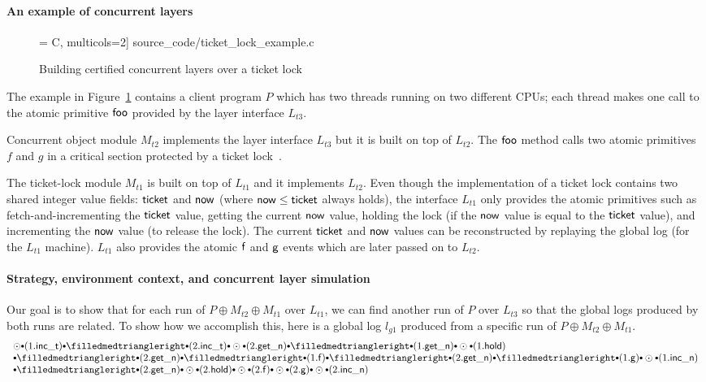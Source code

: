 \paragraph{An example of concurrent layers}
\begin{figure}[t]
\label{fig:exp:ticket_lock_example}
 = C, multicols=2] {source_code/ticket_lock_example.c}
\caption{Building certified concurrent layers over a ticket lock}
\hrulefill
\end{figure}
The example in Figure~\ref{fig:exp:ticket_lock_example} contains a
client program $P$ which has two threads running on two different
CPUs; each thread makes one call to the atomic primitive $\mathsf{foo}$
provided by the layer interface $L_{t3}$.

Concurrent object module $M_{t2}$ implements the layer interface $L_{t3}$
but it is built on top of $L_{t2}$.  The $\mathsf{foo}$ method calls two
atomic primitives $f$ and $g$ in a critical section protected by a
ticket lock~\cite{mcs91}.

The ticket-lock module $M_{t1}$ is built on top of $L_{t1}$ and it
implements $L_{t2}$. Even though the implementation of a ticket lock
contains two shared integer value fields: $\mathsf{ticket}$ and
$\mathsf{now}$ (where $\mathsf{now} \leq \mathsf{ticket}$ always holds), the
interface $L_{t1}$ only provides the atomic primitives such as
fetch-and-incrementing the $\mathsf{ticket}$ value, getting the current
$\mathsf{now}$ value, holding the lock (if the $\mathsf{now}$ value is
equal to the $\mathsf{ticket}$ value), and incrementing the $\mathsf{now}$
value (to release the lock). The current $\mathsf{ticket}$ and
$\mathsf{now}$ values can be reconstructed by replaying the global log
(for the $L_{t1}$ machine).  $L_{t1}$ also provides the atomic $\mathsf{f}$
and $\mathsf{g}$ events which are later passed on to $L_{t2}$.

\paragraph{Strategy, environment context, and concurrent layer simulation}
Our goal is to show that for each run of $P\oplus{}M_{t2}\oplus{}M_{t1}$
over $L_{t1}$, we can find another run of $P$ over $L_{t3}$ so that the
global logs produced by both runs are related.
To show how we accomplish this, here is
a global log $l_{g1}$ produced from  
a specific run of $P\oplus{}M_{t2}\oplus{}M_{t1}$.
\[
\begin{array}{l}
\ssame \cons (1.\incticket) \cons
\sdiff \cons (2.\incticket) \cons
\ssame \cons (2.\getnow) \cons
\sdiff \cons (1.\getnow) \cons
\ssame \cons (1.\holdlock) 
\\
\cons 
\sdiff \cons (2.\getnow) \cons
\sdiff \cons (1.\comm{f}) \cons
\sdiff \cons (2.\getnow) \cons
\sdiff \cons (1.\comm{g}) \cons
\ssame \cons (1.\incnow) 
\\
\cons \sdiff \cons (2.\getnow) \cons
\ssame \cons (2.\holdlock) \cons
\ssame \cons (2.\comm{f}) \cons
\ssame \cons (2.\comm{g}) \cons
\ssame \cons (2.\incnow) 
\end{array}
\]

